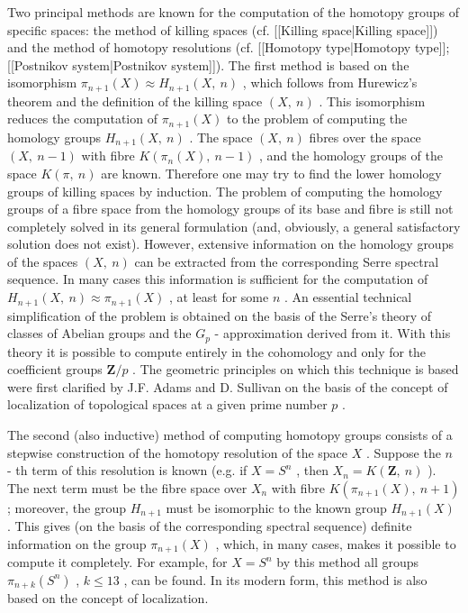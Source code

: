 Two principal methods are known for the computation of the homotopy groups of specific spaces: the method of killing spaces (cf. [[Killing space|Killing space]]) and the method of homotopy resolutions (cf. [[Homotopy type|Homotopy type]]; [[Postnikov system|Postnikov system]]). The first method is based on the isomorphism $  \pi _{n+1} (X) \approx H _{n+1} ( X ,\  n ) $ , 
which follows from Hurewicz's theorem and the definition of the killing space $  ( X ,\  n ) $ . 
This isomorphism reduces the computation of $  \pi _{n+1} (X) $ 
to the problem of computing the homology groups $  H _{n+1} ( X ,\  n ) $ . 
The space $  ( X ,\  n ) $ 
fibres over the space $  ( X ,\  n - 1 ) $ 
with fibre $  K ( \pi _{n} (X) ,\  n - 1 ) $ , 
and the homology groups of the space $  K ( \pi ,\  n ) $ 
are known. Therefore one may try to find the lower homology groups of killing spaces by induction. The problem of computing the homology groups of a fibre space from the homology groups of its base and fibre is still not completely solved in its general formulation (and, obviously, a general satisfactory solution does not exist). However, extensive information on the homology groups of the spaces $  ( X ,\  n ) $ 
can be extracted from the corresponding Serre spectral sequence. In many cases this information is sufficient for the computation of $  H _{n+1} ( X ,\  n ) \approx \pi _{n+1} (X) $ , 
at least for some $  n $ . 
An essential technical simplification of the problem is obtained on the basis of the Serre's theory of classes of Abelian groups and the $  G _{p} $ -
approximation derived from it. With this theory it is possible to compute entirely in the cohomology and only for the coefficient groups $  \mathbf Z / p $ . 
The geometric principles on which this technique is based were first clarified by J.F. Adams and D. Sullivan on the basis of the concept of localization of topological spaces at a given prime number $  p $ .


The second (also inductive) method of computing homotopy groups consists of a stepwise construction of the homotopy resolution of the space $  X $ . 
Suppose the $  n $ -
th term of this resolution is known (e.g. if $  X = S ^{n} $ , 
then $  X _{n} = K ( \mathbf Z ,\  n ) $ ). 
The next term must be the fibre space over $  X _{n} $ 
with fibre $  K ( \pi _{n+1} (X) ,\  n + 1 ) $ ; 
moreover, the group $  H _{n+1} $ 
must be isomorphic to the known group $  H _{n+1} (X) $ . 
This gives (on the basis of the corresponding spectral sequence) definite information on the group $  \pi _{n+1} (X) $ , 
which, in many cases, makes it possible to compute it completely. For example, for $  X = S ^{n} $ 
by this method all groups $  \pi _{n+k} ( S ^{n} ) $ , 
$  k \leq 13 $ , 
can be found. In its modern form, this method is also based on the concept of localization.

